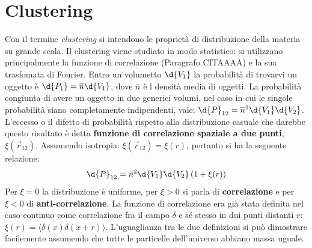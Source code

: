 \chapter{Clustering}\label{10:ch}
Con il termine \textit{clustering} si intendono le proprietà di distribuzione della materia su grande scala. Il clustering viene studiato in modo statistico: si utilizzano principalmente la funzione di correlazione (Paragrafo CITAAAA) e la sua trasfomata di Fourier. Entro un volumetto $\d{V_1}$ la probabilità di trovarvi un oggetto è $\d{P_1}=\overline{n}\d{V_1}$, dove $\overline{n}$ è l densità media di oggetti. La probabilità congiunta di avere un oggetto in due generici volumi, nel caso in cui le singole probabilità siano completamente indipendenti, vale: $\d{P}_{12}=\overline{n}^2 \d{V_1}\d{V_2}$. L'eccesso o il difetto di probabilità rispetto alla distribuzione casuale che darebbe questo risultato è detta \textbf{funzione di correlazione spaziale a due punti}, $\xi(\vec{r}_{12})$. Assumendo isotropia: $\xi(\vec{r}_{12})=\xi(r)$, pertanto si ha la seguente relazione: 
\begin{equation}
    \d{P}_{12}=\overline{n}^2 \d{V_1}\d{V_2} \left(1+\xi(r)\right)
\end{equation}
Per $\xi = 0$ la distribuzione è uniforme, per $\xi >0$ si parla di \textbf{correlazione} e per $\xi <0$ di \textbf{anti-correlazione}. La funzione di correlazione era già stata definita nel caso continuo come correlazione fra il campo $\delta$ e sé stesso in dui punti distanti $r$: $\xi (r)=\langle \delta (x)\delta(x+r) \rangle $. L'uguaglianza tra le due definizioni si può dimostrare facilemente assumendo che tutte le particelle dell'universo abbiano massa uguale. 

